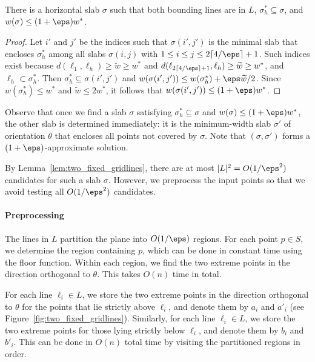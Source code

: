 \begin{lemma}
    \label{lem:two_fixed_gridlines}
    There is a horizontal slab $\sigma$ such that  
    both bounding lines are in $L$, 
    $\sigma_h^* \subseteq \sigma $, and $w(\sigma) \le (1 + \eps) w^*$.
\end{lemma}
\begin{proof}
    Let $i'$ and $j'$ be the indices such that $\sigma(i', j')$ is the minimal slab that encloses $\sigma_h^*$ among all slabs $\sigma(i,j)$ with $1 \le i \le j \le 2\lceil 4/\eps \rceil + 1$.
    Such indices exist because $d(\ell_1, \ell_h) \ge \widetilde w \ge w^*$ and $d(\ell_{2 \lceil 4/\eps \rceil +1 }, \ell_h)\ge \widetilde w \ge w^*$, and $\ell_h \subset \sigma_h^*$. 
    Then $\sigma_h^* \subseteq \sigma(i', j')$ and $w(\sigma(i', j')) \le w(\sigma_h^*) + \eps \widetilde{w}/2$. 
    Since $w(\sigma_h^*) \le w^*$ and $\widetilde w \le 2w^*$, it follows that $w(\sigma(i', j')) \le (1+\eps) w^*$. 
\end{proof}

Observe that once we find a slab $\sigma$ satisfying $\sigma_h^* \subseteq \sigma$ and 
$w(\sigma) \le (1+\eps)w^*$, the other slab is determined immediately: it is the minimum-width slab 
$\sigma'$ of orientation $\theta$ that encloses all points not covered by $\sigma$.  
Note that $(\sigma, \sigma')$ forms a $(1+\eps)$-approximate solution.

By Lemma~\ref{lem:two_fixed_gridlines},   there are at most $|L|^2 = O(1/\eps^2)$ candidates for such a slab $\sigma$.  
However, we preprocess the input points so that we avoid testing all $O(1/\eps^2)$ candidates.


\paragraph*{Preprocessing}
The lines in $L$ partition the plane into $O(1/\eps)$ regions. 
For each point $p \in S$, we determine the region containing $p$, which can be done in constant time using the floor function.  
Within each region, we find the two extreme points in the direction orthogonal to $\theta$. 
This takes $O(n)$ time in total. 

For each line $\ell_i \in L$, we store the two extreme points in the direction orthogonal to $\theta$ for the points that lie strictly above $\ell_i$, and denote them by $a_i$ and $a'_i$ (see Figure~\ref{fig:two_fixed_gridlines}).
Similarly, for each line $\ell_i \in L$, we store the two extreme points for those lying strictly below $\ell_i$, and denote them by $b_i$ and $b'_i$.
This can be done in $O(n)$ total time by visiting the partitioned regions in order. 


